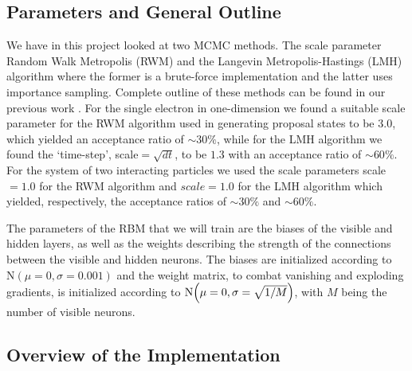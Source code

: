 \subsection{Parameters and General Outline}
We have in this project looked at two MCMC methods. The scale parameter Random Walk Metropolis (RWM) and the Langevin Metropolis-Hastings (LMH) algorithm where the former is a brute-force implementation and the latter uses importance sampling. Complete outline of these methods can be found in our previous work \citep{project1}. For the single electron in one-dimension we found a suitable scale parameter for the RWM algorithm used in generating proposal states to be $3.0$, which yielded an acceptance ratio of $\sim 30\%$, while for the LMH algorithm we found the `time-step', scale$=\sqrt{dt}$, to be $1.3$ with an acceptance ratio of $\sim 60\%$. For the system of two interacting particles we used the scale parameters scale$=1.0$ for the RWM algorithm and $scale=1.0$ for the LMH algorithm which yielded, respectively, the acceptance ratios of $\sim 30\%$ and $\sim60\%$. 

The parameters of the RBM that we will train are the biases of the visible and hidden layers, as well as the weights describing the strength of the connections between the visible and hidden neurons. The biases are initialized according to $\mathrm{N}(\mu=0, \sigma=0.001)$ and the weight matrix, to combat vanishing and exploding gradients, is initialized according to $\mathrm{N} \qty(\mu=0, \sigma=\sqrt{1 / M})$, with $M$ being the number of visible neurons. 


\subsection{Overview of the Implementation}

